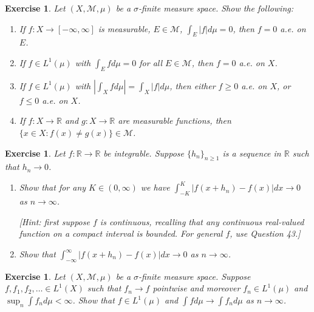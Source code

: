 \documentclass{article}
\newtheorem{exercise}[theorem]{Exercise}
\begin{document}
\begin{exercise}
Let \( (X, \mathcal{M}, \mu) \) be a \(\sigma\)-finite measure space. Show the following:
    
    \begin{enumerate}
        \item[(a)] If \( f : X \to [-\infty, \infty] \) is measurable, \( E \in \mathcal{M} \), \( \int_E |f| d\mu = 0 \), then \( f = 0 \) a.e. on \( E \).
        \item[(b)] If \( f \in L^1(\mu) \) with \( \int_E f d\mu = 0 \) for all \( E \in \mathcal{M} \), then \( f = 0 \) a.e. on \( X \).
        \item[(c)] If \( f \in L^1(\mu) \) with \( |\int_X f d\mu| = \int_X |f| d\mu \), then either \( f \geq 0 \) a.e. on \( X \), or \( f \leq 0 \) a.e. on \( X \).
        \item[(d)] If \( f : X \to \mathbb{R} \) and \( g : X \to \mathbb{R} \) are measurable functions, then \( \{ x \in X : f(x) \neq g(x) \} \in \mathcal{M} \).
    \end{enumerate}
\end{exercise}
\begin{exercise}
Let \( f : \mathbb{R} \to \mathbb{R} \) be integrable. Suppose \( \{h_n\}_{n \geq 1} \) is a sequence in \( \mathbb{R} \) such that \( h_n \to 0 \).
    
    \begin{enumerate}
        \item[(a)] Show that for any \( K \in (0, \infty) \) we have \( \int_{-K}^{K} |f(x + h_n) - f(x)|dx \to 0 \) as \( n \to \infty \). 
        
        \textit{[Hint: first suppose \( f \) is continuous, recalling that any continuous real-valued function on a compact interval is bounded. For general \( f \), use Question 43.]}
        
        \item[(b)] Show that \( \int_{-\infty}^{\infty} |f(x + h_n) - f(x)|dx \to 0 \) as \( n \to \infty \).
    \end{enumerate}
\end{exercise}  
\begin{exercise}
Let \( (X, \mathcal{M}, \mu) \) be a \(\sigma\)-finite measure space. Suppose \( f, f_1, f_2, \dots \in L^1(X) \) such that \( f_n \to f \) pointwise and moreover \( f_n \in L^1(\mu) \) and \( \sup_n \int f_n d\mu < \infty \). Show that \( f \in L^1(\mu) \) and \( \int f d\mu \to \int f_n d\mu \) as \( n \to \infty \).
\end{exercise}
\end{document}
